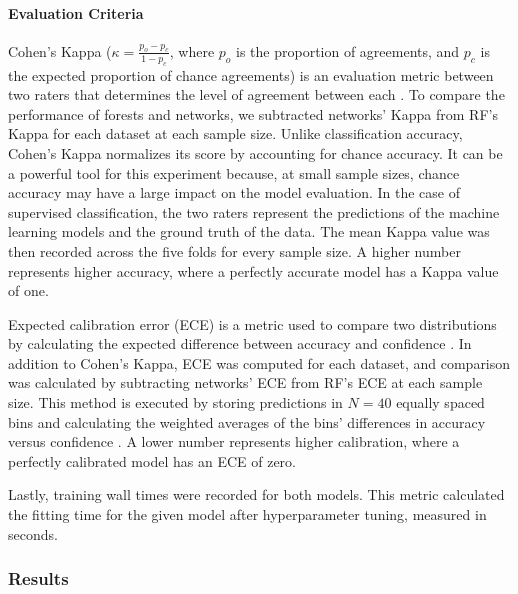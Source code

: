 \paragraph{Evaluation Criteria}
Cohen's Kappa ($\kappa = \frac{p_o - p_c}{1 - p_c}$, where $p_o$ is the proportion of agreements, and $p_c$ is the expected proportion of chance agreements) is an evaluation metric between two raters that determines the level of agreement between each \citep{cohen}.
To compare the performance of forests and networks, we subtracted networks' Kappa from RF's Kappa for each dataset at each sample size. Unlike classification accuracy, Cohen's Kappa normalizes its score by accounting for chance accuracy. It can be a powerful tool for this experiment because, at small sample sizes, chance accuracy may have a large impact on the model evaluation. In the case of supervised classification, the two raters represent the predictions of the machine learning models and the ground truth of the data. The mean Kappa value was then recorded across the five folds for every sample size. A higher number represents higher accuracy, where a perfectly accurate model has a Kappa value of one.

Expected calibration error (ECE) is a metric used to compare two distributions by calculating the expected difference between accuracy and confidence \citep{naeini2015obtaining}. In addition to Cohen's Kappa, ECE was computed for each dataset, and comparison was calculated by subtracting networks' ECE from RF's ECE at each sample size. This method is executed by storing predictions in $N = 40$ equally spaced bins and calculating the weighted averages of the bins' differences in accuracy versus confidence \citep{pmlr-v70-guo17a}.
A lower number represents higher calibration, where a perfectly calibrated model has an ECE of zero.

Lastly, training wall times were recorded for both models. This metric calculated the fitting time for the given model after hyperparameter tuning, measured in seconds.

\subsubsection{Results}
